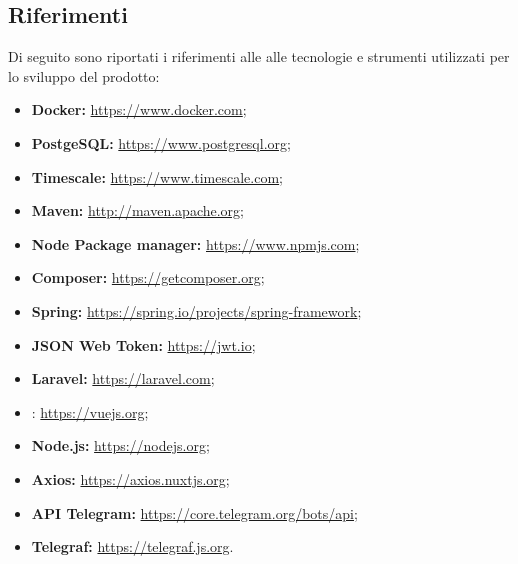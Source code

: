 	\subsection{Riferimenti}
		Di seguito sono riportati i riferimenti alle alle tecnologie e strumenti utilizzati per lo sviluppo del prodotto:
		\begin{itemize}
			\item \textbf{Docker:} \url{https://www.docker.com};
			\item \textbf{PostgeSQL:} \url{https://www.postgresql.org};
			\item \textbf{Timescale:} \url{https://www.timescale.com};
			\item \textbf{Maven:} \url{http://maven.apache.org};
			\item \textbf{Node Package manager:} \url{https://www.npmjs.com};
			\item \textbf{Composer:} \url{https://getcomposer.org};
			\item \textbf{Spring:} \url{https://spring.io/projects/spring-framework};
			\item \textbf{JSON Web Token:} \url{https://jwt.io};
			\item \textbf{Laravel:} \url{https://laravel.com};
			\item {}: \url{https://vuejs.org};
			\item \textbf{Node.js:} \url{https://nodejs.org};
			\item \textbf{Axios:} \url{https://axios.nuxtjs.org};
			\item \textbf{API Telegram:} \url{https://core.telegram.org/bots/api};
			\item \textbf{Telegraf:} \url{https://telegraf.js.org}. 
		\end{itemize}
